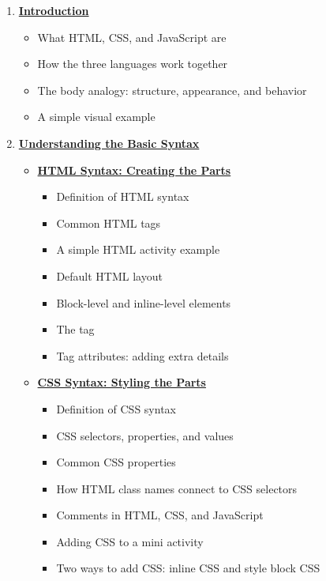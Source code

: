 \documentclass{article}
\begin{document}
\begin{enumerate}[leftmargin=1.2cm, itemsep=8pt]

  \item \hyperref[sec:introduction]{\textbf{\Bitter\textcolor{naranja}{Introduction}}}

        \begin{itemize}[leftmargin=0.8cm, itemsep=3pt]
          \item What HTML, CSS, and JavaScript are
          \item How the three languages work together
          \item The body analogy: structure, appearance, and behavior
          \item A simple visual example
        \end{itemize}

  \item \hyperref[sec:basic-syntax]{\textbf{\Bitter\textcolor{naranja}{Understanding the Basic Syntax}}}

        \begin{itemize}[leftmargin=0.8cm, itemsep=6pt]

          \item \hyperref[subsec:html-syntax]{\textbf{HTML Syntax: Creating the Parts}}
                \begin{itemize}[leftmargin=0.8cm, itemsep=3pt]
                  \item Definition of HTML syntax
                  \item Common HTML tags
                  \item A simple HTML activity example
                  \item Default HTML layout
                  \item Block-level and inline-level elements
                  \item The  tag
                  \item Tag attributes: adding extra details
                \end{itemize}

          \item \hyperref[subsec:css-syntax]{\textbf{CSS Syntax: Styling the Parts}}
                \begin{itemize}[leftmargin=0.8cm, itemsep=3pt]
                  \item Definition of CSS syntax
                  \item CSS selectors, properties, and values
                  \item Common CSS properties
                  \item How HTML class names connect to CSS selectors
                  \item Comments in HTML, CSS, and JavaScript
                  \item Adding CSS to a mini activity
                  \item Two ways to add CSS: inline CSS and style block CSS
                \end{itemize}


\end{itemize}
\end{enumerate}
\end{document}
